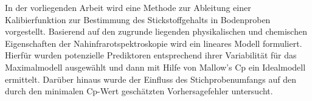 In der vorliegenden Arbeit wird eine Methode zur Ableitung einer Kalibierfunktion zur Bestimmung des Stickstoffgehalts in Bodenproben vorgestellt.
Basierend auf den zugrunde liegenden physikalischen und chemischen Eigenschaften der Nahinfrarotspektroskopie wird ein lineares Modell formuliert. 
Hierfür wurden potenzielle Prediktoren entsprechend ihrer Variabilität für das Maximalmodell ausgewählt und dann mit Hilfe von Mallow's Cp ein Idealmodell ermittelt. 
Darüber hinaus wurde der Einfluss des Stichprobenumfangs auf den durch den minimalen Cp-Wert geschätzten Vorhersagefehler untersucht.